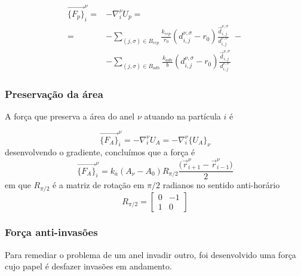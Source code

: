 \documentclass{article}
\theoremstyle{definition}
\def \quantity#1#2#3{\vec{#1}_{#2}^{#3}}
\def \quantitysc#1#2#3{{#1}_{#2}^{#3}}
\def \quantityg#1#2#3#4#5{\vec{#1}_{#2, #3}^{#4, #5}}
\def \quantitygsc#1#2#3#4#5{{#1}_{#2, #3}^{#4, #5}}
\def \deslocg#1#2#3#4{\quantityg{d}{#1}{#2}{#3}{#4}}
\def \deslocgsc#1#2#3#4{\quantitygsc{d}{#1}{#2}{#3}{#4}}
\begin{document}
\begin{equation}
\begin{aligned}
    \quantity{\{F_p\}}{i}{\nu} = &- \quantitysc{\nabla}{i}{\nu} U_p = \\ 
    = &-\sum_{(j, \sigma) \in B_{rep}} \frac{k_{rep}}{r_0}(\deslocgsc{i}{j}{\nu}{\sigma} - r_0)\frac{\deslocg{i}{j}{\nu}{\sigma}}{\deslocgsc{i}{j}{\nu}{\sigma}} ~~-\\
    &-\sum_{(j, \sigma) \in B_{adh}} \frac{k_{adh}}{b}(\deslocgsc{i}{j}{\nu}{\sigma} - r_0)\frac{\deslocg{i}{j}{\nu}{\sigma}}{\deslocgsc{i}{j}{\nu}{\sigma}}
\end{aligned}
\label{eq:force_particle_particle}
\end{equation}

\subsubsection{Preservação da área}
A força que preserva a área do anel $\nu$ atuando na partícula $i$ é

\[    
\quantity{\{F_A\}}{i}{\nu} = - \quantitysc{\nabla}{i}{\nu}U_A = -\quantitysc{\nabla}{i}{\nu} \{U_A\}_\nu
\]
desenvolvendo o gradiente, concluímos que a força é
\begin{equation}
    \quantity{\{F_A\}}{i}{\nu} = k_a (A_\nu - A_0) R_{\pi/2}\frac{\big( \quantity{r}{i+1}{\nu} - \quantity{r}{i-1}{\nu}\big)}{2}
\label{eq:force_area}
\end{equation}
em que $R_{\pi/2}$ é a matriz de rotação em $\pi/2$ radianos no sentido anti-horário
\[
    R_{\pi/2} = \begin{bmatrix}
        0 &-1 \\
        1 &0
    \end{bmatrix}
\]

\subsubsection{Força anti-invasões}
Para remediar o problema de um anel invadir outro, foi desenvolvido uma força cujo papel é desfazer invasões em andamento.
\end{document}
